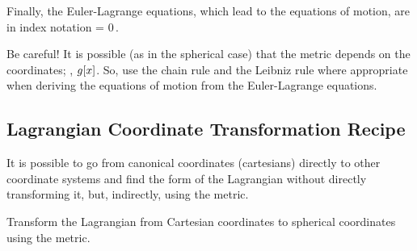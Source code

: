 Finally, the Euler-Lagrange equations, which lead to the equations of motion, are in index notation
\beq
{} = 0\,.
\eeq

\begin{caution}
Be careful! It is possible (as in the spherical case) that the metric depends on the coordinates; \ie, $g\!\left[{x}\right]$. So, use the chain rule and the Leibniz rule where appropriate when deriving the equations of motion from the Euler-Lagrange equations.
\end{caution}


\subsection{Lagrangian Coordinate Transformation Recipe}
It is possible to go from canonical coordinates (cartesians) directly to other coordinate systems and find the form of the Lagrangian without directly transforming it, but, indirectly, using the metric.

\begin{example}
Transform the Lagrangian from Cartesian coordinates to spherical coordinates using the metric.
\end{example}

